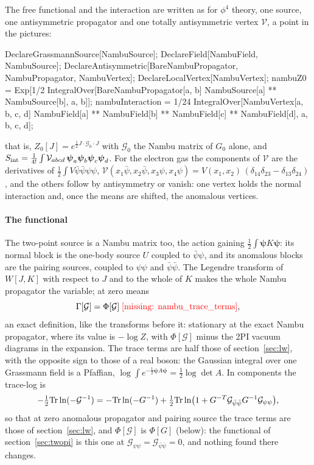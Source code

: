 \documentclass[11pt,a4paper]{article}
\newcommand{\formula}[1]{\IfFileExists{figures/formula_#1.tex}{}{\text{\textcolor{red}{[missing: \detokenize{#1}]}}}}
\newcommand{\sfield}{\boldsymbol\psi}
\begin{document}
The free functional and the interaction are written as for $\phi^4$ theory, one source, one antisymmetric propagator and
one totally antisymmetric vertex $\mathcal V$, a point in the pictures:
\begin{code}
DeclareGrassmannSource[NambuSource]; DeclareField[NambuField, NambuSource];
DeclareAntisymmetric[BareNambuPropagator, NambuPropagator, NambuVertex];
DeclareLocalVertex[NambuVertex];
nambuZ0 = Exp[1/2 IntegralOver[BareNambuPropagator[a, b] NambuSource[a] **
    NambuSource[b], {a, b}]];
nambuInteraction = 1/24 IntegralOver[NambuVertex[a, b, c, d] NambuField[a] **
    NambuField[b] ** NambuField[c] ** NambuField[d], {a, b, c, d}];
\end{code}
that is, $Z_0[J]=e^{\frac12J\cdot\mathcal G_0\cdot J}$ with $\mathcal G_0$ the Nambu matrix of $G_0$ alone, and $S_{\rm int}=\frac1{4!}
\int\mathcal V_{abcd}\,\sfield_a\sfield_b\sfield_c\sfield_d$. For the electron gas the components of $\mathcal V$ are the
derivatives of $\frac12\int V\bar\psi\bar\psi\psi\psi$, $\mathcal V(x_1\bar\psi,x_2\bar\psi,x_3\psi,x_4\psi)=V(x_1,x_2)\,
(\delta_{14}\delta_{23}-\delta_{13}\delta_{24})$, and the others follow by antisymmetry or vanish: one vertex holds the
normal interaction and, once the means are shifted, the anomalous vertices.

\paragraph{The functional} The two-point source is a Nambu matrix too, the action gaining $\frac12\int\sfield K\sfield$: its
normal block is the one-body source $U$ coupled to $\bar\psi\psi$, and its anomalous blocks are the pairing sources, coupled to
$\psi\psi$ and $\bar\psi\bar\psi$. The Legendre transform of $W[J,K]$ with respect to $J$ and to the whole of $K$ makes the whole
Nambu propagator the variable; at zero means
\[
\Gamma[\mathcal G]=\Phi[\mathcal G]\;\formula{nambu_trace_terms},
\]
an exact definition, like the transforms before it: stationary at the exact Nambu propagator, where its value is $-\log Z$,
with $\Phi[\mathcal G]$ minus the 2PI vacuum diagrams in the expansion. The trace terms are half those of
section~\ref{sec:lw}, with the opposite sign to those of a real boson: the Gaussian integral over one Grassmann field is a
Pfaffian, $\log\int e^{-\frac12\sfield A\sfield}=\frac12\log\det A$. In components the trace-log is
\[
-\tfrac12{\rm Tr}\ln(-\mathcal G^{-1})=-{\rm Tr}\ln(-G^{-1})+\tfrac12{\rm Tr}\ln\bigl(1+G^{-T}\mathcal G_{\bar\psi\bar\psi}G^{-1}
\mathcal G_{\psi\psi}\bigr),
\]
so that at zero anomalous propagator and pairing source the trace terms are those of section~\ref{sec:lw}, and $\Phi[\mathcal G]$
is $\Phi[G]$ (below): the functional of section~\ref{sec:twopi} is this one at $\mathcal G_{\psi\psi}=\mathcal G_{\bar\psi\bar\psi}=0$, and
nothing found there changes.
\end{document}
